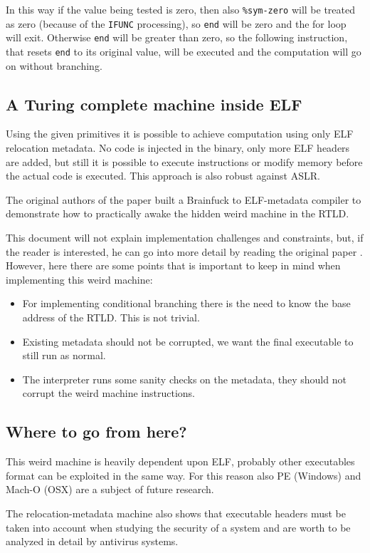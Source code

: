 \documentclass[11pt,twoside,a4paper]{article}
\begin{document}
In this way if the value being tested is zero, then also \texttt{\%sym-zero} will be treated as zero (because of the \texttt{IFUNC} processing), so \texttt{end} will be zero and the for loop will exit. Otherwise \texttt{end} will be greater than zero, so the following instruction, that resets \texttt{end} to its original value, will be executed and the computation will go on without branching.


\subsection{A Turing complete machine inside ELF}

Using the given primitives it is possible to achieve computation using only ELF relocation metadata. No code is injected in the binary, only more ELF headers are added, but still it is possible to execute instructions or modify memory before the actual code is executed. This approach is also robust against ASLR.

The original authors of the paper built a Brainfuck to ELF-metadata compiler to demonstrate how to practically awake the hidden weird machine in the RTLD.

This document will not explain implementation challenges and constraints, but, if the reader is interested, he can go into more detail by reading the original paper \cite{elf_machine}. However, here there are some points that is important to keep in mind when implementing this weird machine:
\begin{itemize}
\item For implementing conditional branching there is the need to know the base address of the RTLD. This is not trivial.
\item Existing metadata should not be corrupted, we want the final executable to still run as normal.
\item The interpreter runs some sanity checks on the metadata, they should not corrupt the weird machine instructions.
\end{itemize}


\subsection{Where to go from here?}
This weird machine is heavily dependent upon ELF, probably other executables format can be exploited in the same way. For this reason also PE (Windows) and Mach-O (OSX) are a subject of future research.

The relocation-metadata machine also shows that executable headers must be taken into account when studying the security of a system and are worth to be analyzed in detail by antivirus systems.
\end{document}

